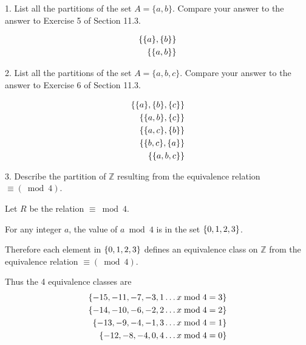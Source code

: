 \documentclass{idrisMemo}
\begin{document}
\toc
\thispagestyle{styleTOC}
\pagebreak
\pagestyle{styleE}

\begin{prooflist}{1. List all the partitions of the set $A=\{a, b\}$. Compare your answer to the answer to Exercise 5 of Section 11.3.}
\item
    \begin{align*}
        \{\{a\}, \{b\}\}\\
        \{\{a, b\}\}
    \end{align*}
\end{prooflist}

\begin{prooflist}{2. List all the partitions of the set $A=\{a, b, c\}$. Compare
    your answer to the answer to Exercise 6 of Section 11.3.}
\item
\begin{align*}
    \{\{a\}, \{b\}, \{c\}\}\\
    \{\{a, b\}, \{c\}\}\\
    \{\{a, c\}, \{b\}\}\\
    \{\{b, c\}, \{a\}\}\\
    \{\{a, b, c\}\}
\end{align*}
\end{prooflist}

\begin{prooflist}{3. Describe the partition of $\mathbb{Z}$ resulting from the equivalence relation $\equiv(\bmod 4)$.}
\item Let $R$ be the relation $\equiv\bmod 4$.
\item For any integer $a$, the value of $a\bmod 4$ is in the set $\{0, 1, 2, 3\}$.
\item Therefore each element in $\{0, 1, 2, 3\}$ defines an equivalence class
    on $\mathbb{Z}$ from the equivalence relation $\equiv(\bmod 4)$.
\item Thus the 4 equivalence classes are
\begin{align*}
    \{-15, -11, -7, -3, 1 \dots x\bmod4=3\}\\
    \{-14, -10, -6, -2, 2 \dots x\bmod4=2\}\\
    \{-13, -9, -4, -1, 3 \dots x\bmod4=1\}\\
    \{-12, -8, -4, 0, 4 \dots x\bmod4=0\}\\
\end{align*}

\end{prooflist}
\end{document}
